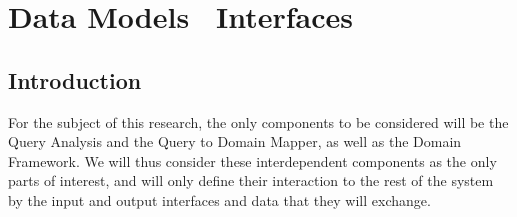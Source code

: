 \chapter{Data Models \amper\ Interfaces} %
\label{cha:data_models_interfaces}

\section{Introduction} %
\label{sec:introduction_data_models}

For the subject of this research, the only components to be considered will be the Query Analysis and the Query to Domain Mapper, as well as the Domain Framework. We will thus consider these interdependent components as the only parts of interest, and will only define their interaction to the rest of the system by the input and output interfaces and data that they will exchange.



